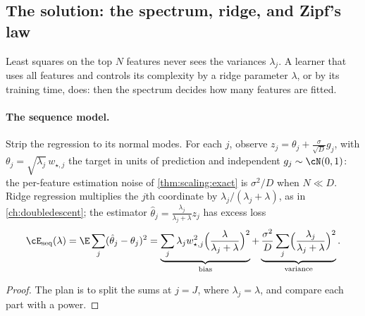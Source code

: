 \begin{refsection}
\section{The solution: the spectrum, ridge, and Zipf's law}\label{sec:scaling:spectrum}

Least squares on the top $N$ features never sees the variances $\lambda_j$. A learner that uses all features and controls its complexity by a ridge parameter $\lambda$, or by its training time, does: then the spectrum decides how many features are fitted.

\paragraph{The sequence model.} Strip the regression to its normal modes. For each $j$, observe $z_j=\theta_j+\frac\sigma{\sqrt D}g_j$, with $\theta_j=\sqrt{\lambda_j}\,w_{\star,j}$ the target in units of prediction and independent $g_j\sim\cN(0,1)$: the per-feature estimation noise of \cref{thm:scaling:exact} is $\sigma^2/D$ when $N\ll D$. Ridge regression multiplies the $j$th coordinate by $\lambda_j/(\lambda_j+\lambda)$, as in \cref{ch:doubledescent}; the estimator $\hat\theta_j=\frac{\lambda_j}{\lambda_j+\lambda}z_j$ has excess loss
\begin{equation}\label{eq:scaling:seq}
  \cE_{\mathrm{seq}}(\lambda)=\E\sum_j(\hat\theta_j-\theta_j)^2=\underbrace{\sum_j\lambda_jw_{\star,j}^2\Bigl(\frac\lambda{\lambda_j+\lambda}\Bigr)^2}_{\text{bias}}+\underbrace{\frac{\sigma^2}D\sum_j\Bigl(\frac{\lambda_j}{\lambda_j+\lambda}\Bigr)^2}_{\text{variance}} .
\end{equation}


\begin{proof}
The plan is to split the sums at $j=J$, where $\lambda_j=\lambda$, and compare each part with a power.


\end{proof}
\end{refsection}
